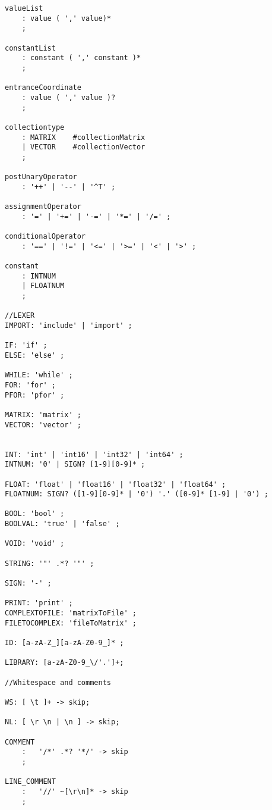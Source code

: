 \begin{lstlisting}[caption={\acrshort{cfg} and Lexing rules},frame=tlrb,numbers=none]
valueList
    : value ( ',' value)*
    ;

constantList
    : constant ( ',' constant )*
    ;

entranceCoordinate
    : value ( ',' value )?
    ;

collectiontype
    : MATRIX    #collectionMatrix
    | VECTOR    #collectionVector
    ;

postUnaryOperator 
    : '++' | '--' | '^T' ;

assignmentOperator
    : '=' | '+=' | '-=' | '*=' | '/=' ;

conditionalOperator
    : '==' | '!=' | '<=' | '>=' | '<' | '>' ;

constant
    : INTNUM  
    | FLOATNUM 
    ;

//LEXER 
IMPORT: 'include' | 'import' ;  
  
IF: 'if' ;
ELSE: 'else' ;

WHILE: 'while' ;
FOR: 'for' ;   
PFOR: 'pfor' ;

MATRIX: 'matrix' ;
VECTOR: 'vector' ;


INT: 'int' | 'int16' | 'int32' | 'int64' ;
INTNUM: '0' | SIGN? [1-9][0-9]* ;

FLOAT: 'float' | 'float16' | 'float32' | 'float64' ;  
FLOATNUM: SIGN? ([1-9][0-9]* | '0') '.' ([0-9]* [1-9] | '0') ;

BOOL: 'bool' ;
BOOLVAL: 'true' | 'false' ;

VOID: 'void' ;

STRING: '"' .*? '"' ;

SIGN: '-' ;   

PRINT: 'print' ;
COMPLEXTOFILE: 'matrixToFile' ;
FILETOCOMPLEX: 'fileToMatrix' ;

ID: [a-zA-Z_][a-zA-Z0-9_]* ;    

LIBRARY: [a-zA-Z0-9_\/'.']+;

//Whitespace and comments

WS: [ \t ]+ -> skip;

NL: [ \r \n | \n ] -> skip;

COMMENT
    :   '/*' .*? '*/' -> skip
    ;

LINE_COMMENT
    :   '//' ~[\r\n]* -> skip
    ;
                                                
\end{lstlisting}